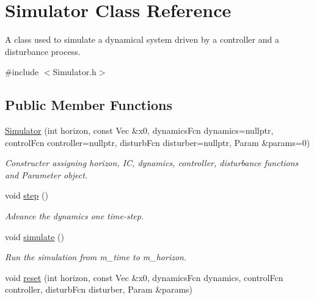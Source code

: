 \hypertarget{classSimulator}{}\section{Simulator Class Reference}
\label{classSimulator}


A class used to simulate a dynamical system driven by a controller and a disturbance process.  




{\ttfamily \#include $<$Simulator.\+h$>$}

\subsection*{Public Member Functions}
\begin{DoxyCompactItemize}
\item 
\mbox{\hyperlink{classSimulator_a4cfe319e3abf788ce05e1ddb322a904e}{Simulator}} (int horizon, const Vec \&x0, dynamics\+Fcn dynamics=nullptr, control\+Fcn controller=nullptr, disturb\+Fcn disturber=nullptr, Param \&params=0)
\begin{DoxyCompactList}\small\item\em Constructer assigning horizon, IC, dynamics, controller, disturbance functions and Parameter object. \end{DoxyCompactList}\item 
void \mbox{\hyperlink{classSimulator_a3bdb2a9b121073e71e424203a9416b04}{step}} ()
\begin{DoxyCompactList}\small\item\em Advance the dynamics one time-\/step. \end{DoxyCompactList}\item 
\mbox{\label{classSimulator_afbc1911a12ff19714760b7791f69f178}} 
void \mbox{\hyperlink{classSimulator_afbc1911a12ff19714760b7791f69f178}{simulate}} ()
\begin{DoxyCompactList}\small\item\em Run the simulation from m\+\_\+time to m\+\_\+horizon. \end{DoxyCompactList}\item 
\mbox{\label{classSimulator_a028f379c1190c84b6af0a4824f10dad0}} 
void \mbox{\hyperlink{classSimulator_a028f379c1190c84b6af0a4824f10dad0}{reset}} (int horizon, const Vec \&x0, dynamics\+Fcn dynamics, control\+Fcn controller, disturb\+Fcn disturber, Param \&params)

\end{DoxyCompactItemize}

